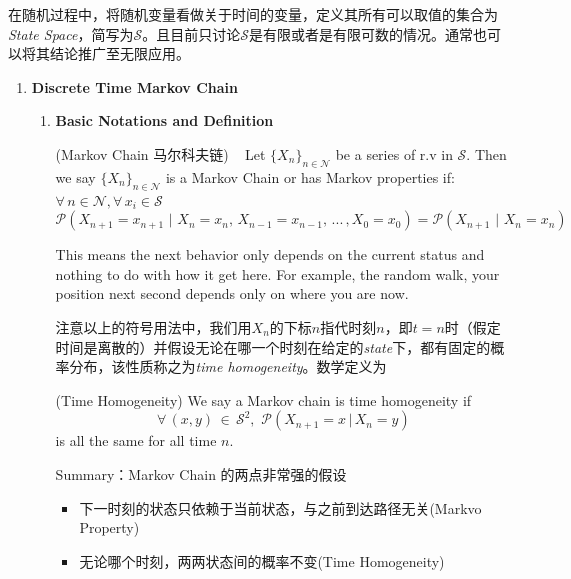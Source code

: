 \documentclass[10.5pt]{article}
\newenvironment{changemargin}[2]{%
  \begin{list}{}{%
    \setlength{\topsep}{0pt}%
    \setlength{\leftmargin}{#1}%
    \setlength{\rightmargin}{#2}%
    \setlength{\listparindent}{\parindent}%
    \setlength{\itemindent}{\parindent}%
    \setlength{\parsep}{\parskip}%
  }%
  \item[]}{\end{list}}
\begin{document}
\begin{changemargin}{-0.125in}{0in}


在随机过程中，将随机变量看做关于时间的变量，定义其所有可以取值的集合为\textit{State Space}，简写为$\mathcal{S}$。且目前只讨论$\mathcal{S}$是有限或者是有限可数的情况。通常也可以将其结论推广至无限应用。

\bigskip

\begin{enumerate}
	
	\item \textbf{Discrete Time Markov Chain}
	
	\smallskip
	
	\begin{enumerate}
	
	\item \textbf{Basic Notations and Definition} 
	\begin{definition}(Markov Chain 马尔科夫链)\,\,\,\,\,
		Let $\{X_n\}_{n \in \mathcal{N}}$ be a series of r.v in $\mathcal{S}$. Then we say $\{X_n\}_{n \in \mathcal{N}}$ is a Markov Chain or has Markov properties if: $\forall\, n \in \mathcal{N}, \forall \, x_i \in \mathcal{S}$ 
		\[
		\mathcal{P}(X_{n+1} = x_{n+1} \, \, | \, \, X_n = x_n, \,X_{n-1} = x_{n-1}, \,...\, , X_0 = x_0) = \mathcal{P}(X_{n+1}\,\,|\,\, X_n = x_n)
		\]
	\end{definition}
	 This means the next behavior only depends on the current status and nothing to do with how it get here. For example, the random walk, your position next second depends only on where you are now. 
	 
	 \medskip
	 
	 注意以上的符号用法中，我们用$X_n$的下标$n$指代时刻$n$，即$t = n$时（假定时间是离散的）并假设无论在哪一个时刻在给定的\textit{state}下，都有固定的概率分布，该性质称之为\textit{time homogeneity}。数学定义为
	 
	 \smallskip
	 
	 
	 \begin{definition}(Time Homogeneity) We say a Markov chain is time homogeneity if 
	 \[
	 \forall \, (x,y)\,\in\,\mathcal{S}^2, \,\,\mathcal{P}(X_{n+1} = x\,|\, X_n = y)
	 \]
	 is all the same for all time $n$.	
	 \end{definition}
	 
	 
	 \smallskip
	 
      \begin{tcolorbox}[notitle,boxrule=0pt,colback=yellow!80,colframe=blue!20]
       Summary：Markov Chain 的两点非常强的假设
       \begin{itemize}
       	\item 下一时刻的状态只依赖于当前状态，与之前到达路径无关(Markvo Property)
       	\item 无论哪个时刻，两两状态间的概率不变(Time Homogeneity)
       \end{itemize}
       \end{tcolorbox}
   	 

\end{enumerate}
\end{enumerate}
\end{changemargin}
\end{document}
